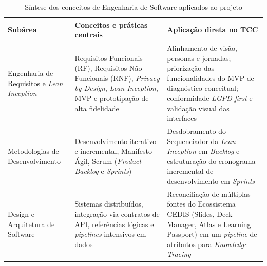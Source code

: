 \begin{table}[H]
\caption{Síntese dos conceitos de Engenharia de Software aplicados ao projeto}
\label{tab:conceitos-engenharia-software}
\centering
\begin{tabularx}{\textwidth}{l>{\raggedright\arraybackslash}X>{\raggedright\arraybackslash}X}
\hline
\textbf{Subárea} & \textbf{Conceitos e práticas centrais} & \textbf{Aplicação direta no TCC} \\
\hline
Engenharia de Requisitos e \textit{Lean Inception} & Requisitos Funcionais (RF), Requisitos Não Funcionais (RNF), \textit{Privacy by Design}, \textit{Lean Inception}, MVP e prototipação de alta fidelidade \cite{sommerville_engenharia_2019, cavoukian_privacy_2009, ries_lean_2011, caroli_lean_2018} & Alinhamento de visão, personas e jornadas; priorização das funcionalidades do MVP de diagnóstico conceitual; conformidade \textit{LGPD-first} e validação visual das interfaces \\
\hline
Metodologias de Desenvolvimento & Desenvolvimento iterativo e incremental, Manifesto Ágil, Scrum (\textit{Product Backlog} e \textit{Sprints}) \cite{beck_manifesto_2001, schwaber_scrum_2020, cohn_user_2004} & Desdobramento do Sequenciador da \textit{Lean Inception} em \textit{Backlog} e estruturação do cronograma incremental de desenvolvimento em \textit{Sprints} \\
\hline
Design e Arquitetura de Software & Sistemas distribuídos, integração via contratos de API, referências lógicas e \textit{pipelines} intensivos em dados \cite{bass_software_2021, richards_fundamentals_2020, kleppmann_designing_2017} & Reconciliação de múltiplas fontes do Ecossistema CEDIS (Slides, Deck Manager, Atlas e Learning Passport) em um \textit{pipeline} de atributos para \textit{Knowledge Tracing} \\
\hline
\end{tabularx}
\end{table}

